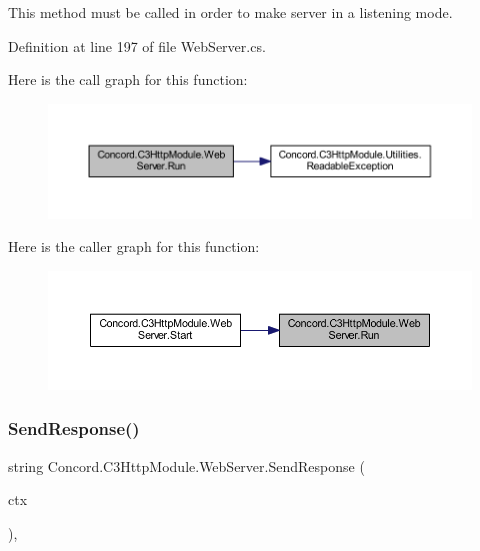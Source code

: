 This method must be called in order to make server in a listening mode. 



Definition at line 197 of file Web\+Server.\+cs.

Here is the call graph for this function\+:
\nopagebreak
\begin{figure}[H]
\begin{center}
\leavevmode
\includegraphics[width=350pt]{class_concord_1_1_c3_http_module_1_1_web_server_a25053b2c9397975cf48565d98b9c2d9e_cgraph}
\end{center}
\end{figure}
Here is the caller graph for this function\+:
\nopagebreak
\begin{figure}[H]
\begin{center}
\leavevmode
\includegraphics[width=350pt]{class_concord_1_1_c3_http_module_1_1_web_server_a25053b2c9397975cf48565d98b9c2d9e_icgraph}
\end{center}
\end{figure}
\mbox{\label{class_concord_1_1_c3_http_module_1_1_web_server_ac9786f7a42e9d04a8c8bda5ff7caa482}} 
\subsubsection{\texorpdfstring{SendResponse()}{SendResponse()}}
{\footnotesize\ttfamily string Concord.\+C3\+Http\+Module.\+Web\+Server.\+Send\+Response (\begin{DoxyParamCaption}\item[{Http\+Listener\+Context}]{ctx }\end{DoxyParamCaption})\hspace{0.3cm}{\ttfamily [inline]}, {\ttfamily [private]}}



